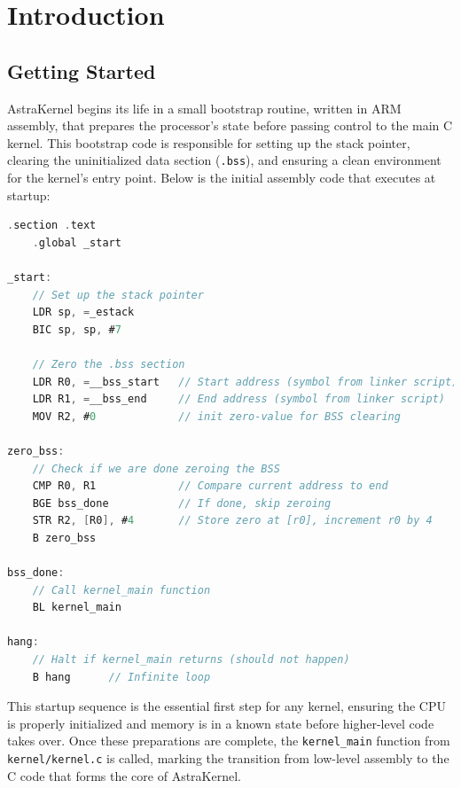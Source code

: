 \newpage
\chapter{Introduction}
\section{Getting Started}
AstraKernel begins its life in a small bootstrap routine, written in ARM assembly, 
that prepares the processor’s state before passing control to the main C kernel. 
This bootstrap code is responsible for setting up the stack pointer, clearing 
the uninitialized data section (\texttt{.bss}), and ensuring a clean environment 
for the kernel’s entry point. Below is the initial assembly code that executes 
at startup: \\

\begin{lstlisting}[language={C}, caption={Initial bootstrap code for AstraKernel.}, label={lst:bootstrap}]
    .section .text
    .global _start

_start:
    // Set up the stack pointer
    LDR sp, =_estack
    BIC sp, sp, #7

    // Zero the .bss section
    LDR R0, =__bss_start   // Start address (symbol from linker script)
    LDR R1, =__bss_end     // End address (symbol from linker script)
    MOV R2, #0             // init zero-value for BSS clearing

zero_bss:
    // Check if we are done zeroing the BSS
    CMP R0, R1             // Compare current address to end
    BGE bss_done           // If done, skip zeroing
    STR R2, [R0], #4       // Store zero at [r0], increment r0 by 4
    B zero_bss

bss_done:
    // Call kernel_main function
    BL kernel_main

hang:
    // Halt if kernel_main returns (should not happen)
    B hang		// Infinite loop
\end{lstlisting}

This startup sequence is the essential first step for any kernel, ensuring the 
CPU is properly initialized and memory is in a known state before higher-level 
code takes over. Once these preparations are complete, the \texttt{kernel\_main} 
function from \texttt{kernel/kernel.c} is called, marking the transition from 
low-level assembly to the C code that forms the core of AstraKernel.

